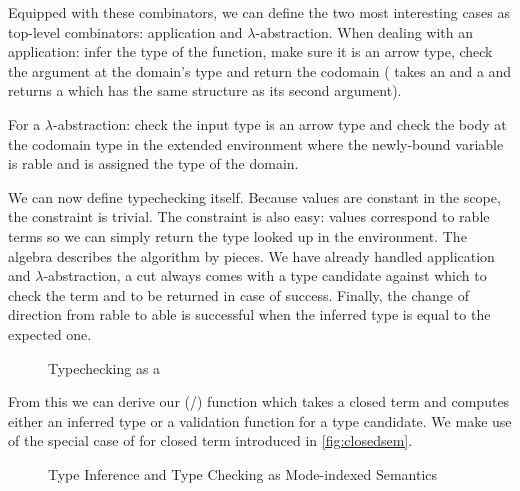 Equipped with these combinators, we can define the two most interesting cases
as top-level combinators: application and $\lambda$-abstraction. When dealing
with an application: infer the type of the function, make sure it is an
arrow type, check the argument at the domain's type and return the codomain
(\AF{\_<\$\_} takes an  and a { } and returns
a { } which has the same structure as its second argument).


For a $\lambda$-abstraction: check the input type is an arrow type and check
the body at the codomain type in the extended environment where the newly-bound
variable is rable and is assigned the type of the domain.


We can now define typechecking itself. Because values are constant in the scope,
the  constraint is trivial. The  constraint
is also easy: values correspond to rable terms so we can simply return
the type looked up in the environment. The algebra describes the algorithm by pieces.
We have already handled application and $\lambda$-abstraction, a cut always comes with
a type candidate against which to check the term  and to be returned in case of
success.
Finally, the change of direction from rable to able is successful
when the inferred type is equal to the expected one.

\begin{figure}[h]
\caption{Typechecking as a }
\end{figure}

From this we can derive our (/) function which takes
a closed term and computes either an inferred type or a validation function for a
type candidate. We make use of the special case of  for closed term
introduced in \cref{fig:closedsem}.

\begin{figure}[h]
\caption{Type Inference and Type Checking as Mode-indexed Semantics\label{fig:typeinfersem}}
\end{figure}

